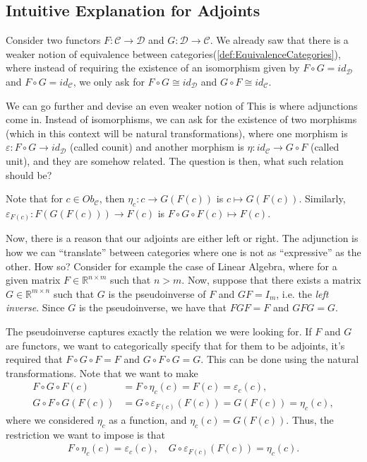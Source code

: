 \subsection{Intuitive Explanation for Adjoints}

Consider two functors $F:\mathcal C \to \mathcal D$ and $G:\mathcal D \to \mathcal C$.
We already saw that there is a weaker notion
of equivalence between categories(\ref{def:EquivalenceCategories}), where instead of
requiring the existence of an isomorphism given by
$F \circ G = id_\mathcal D$ and $F \circ G = id_\mathcal C$, we only
ask for $F \circ G \cong id_\mathcal D$ and $G \circ F \cong id_\mathcal C$.

We can go further and devise an even weaker notion of 
This is where adjunctions come in. Instead
of isomorphisms, we can ask for the existence of two morphisms
(which in this context will be natural transformations),
where one morphism is $\varepsilon:F\circ G \to id_\mathcal D$ (called counit) and another morphism
is $\eta:id_\mathcal C \to G\circ F $ (called unit), and they are somehow related. The question is
then, what such relation should be?

Note that for $c \in Ob_\mathcal C$, then $\eta_c: c \to G(F(c))$ is $c \mapsto G(F(c))$. Similarly,
$\varepsilon_{F(c)}: F(G(F(c))) \to F(c)$ is $F \circ G \circ F(c) \mapsto F(c)$.

Now, there is a reason that our adjoints are either left or right. The adjunction
is how we can ``translate'' between categories where one is not as ``expressive''
as the other. How so? Consider for example the case of Linear Algebra, where
for a given matrix $F \in \mathbb R^{n\times m}$ such that $n > m$. Now, suppose
that there exists a matrix $G \in \mathbb R^{m \times n}$ such that
$G$ is the pseudoinverse of $F$ and $G F = I_m$, i.e. the \textit{left inverse}.
Since $G$ is the pseudoinverse, we have that $F G F = F$ and
$G F G = G$.

The pseudoinverse captures exactly the relation we were looking for. If $F$ and $G$
are functors, we want to categorically specify that for them to be adjoints, it's
required that $F \circ G \circ F = F$ and $G \circ F \circ G = G$.
This can be done using the natural transformations. Note that we want to make
\begin{align*}
  F \circ G \circ F(c) &= F \circ \eta_c(c) = F(c) = \varepsilon_c(c), \\
  G \circ F \circ G(F(c)) &= G\circ \varepsilon_{F(c)}(F(c)) = G(F(c)) = \eta_c(c),
\end{align*}
where we considered $\eta_c$ as a function, and $\eta_c(c) = G(F(c))$.
Thus, the restriction we want to impose is that
\begin{align*}
  F \circ \eta_c(c) = \varepsilon_c(c), \quad
  G\circ \varepsilon_{F(c)}(F(c)) = \eta_c(c).
\end{align*}


